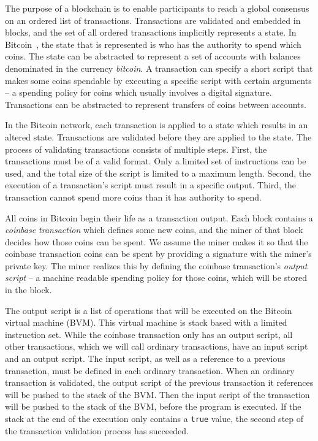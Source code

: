 The purpose of a blockchain is to enable participants to reach a global consensus on an ordered list of transactions. Transactions are validated and embedded in blocks, and the set of all ordered transactions implicitly represents a state. In Bitcoin~\cite{bitcoinwhitepaper}, the state that is represented is who has the authority to spend which coins. The state can be abstracted to represent a set of accounts with balances denominated in the currency \emph{bitcoin}. A transaction can specify a short script that makes some coins spendable by executing a specific script with certain arguments – a spending policy for coins which usually involves a digital signature. Transactions can be abstracted to represent transfers of coins between accounts.

In the Bitcoin network, each transaction is applied to a state which results in an altered state. Transactions are validated before they are applied to the state. The process of validating transactions consists of multiple steps. First, the transactions must be of a valid format. Only a limited set of instructions can be used, and the total size of the script is limited to a maximum length. Second, the execution of a transaction's script must result in a specific output. Third, the transaction cannot spend more coins than it has authority to spend.

All coins in Bitcoin begin their life as a transaction output. Each block contains a \emph{coinbase transaction} which defines some new coins, and the miner of that block decides how those coins can be spent. We assume the miner makes it so that the coinbase transaction coins can be spent by providing a signature with the miner's private key. The miner realizes this by defining the coinbase transaction's \emph{output script} – a machine readable spending policy for those coins, which will be stored in the block. 

The output script is a list of operations that will be executed on the Bitcoin virtual machine (BVM). This virtual machine is stack based with a limited instruction set. While the coinbase transaction only has an output script, all other transactions, which we will call ordinary transactions, have an input script and an output script. The input script, as well as a reference to a previous transaction, must be defined in each ordinary transaction. When an ordinary transaction is validated, the output script of the previous transaction it references will be pushed to the stack of the BVM. Then the input script of the transaction will be pushed to the stack of the BVM, before the program is executed. If the stack at the end of the execution only contains a \texttt{true} value, the second step of the transaction validation process has succeeded. 


